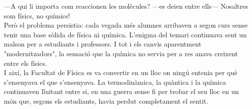 —A qui li importa com reaccionen les molècules? —es deien entre ells— Nosaltres som físics, no químics!\\

Però el problema persistia: cada vegada més alumnes arribaven a segon curs sense tenir una base sòlida de física ni química. L'enigma del temari continuava sent un malson per a estudiants i professors. I tot i els canvis aparentment "modernitzadors", la sensació que la química no servia per a res anava creixent entre els físics.\\

I així, la Facultat de Física es va convertir en un lloc on ningú entenia per què s'ensenyava el que s'ensenyava. La termodinàmica, la quàntica i la química continuaven lluitant entre si, en una guerra sense fi per trobar el seu lloc en un món que, segons els estudiants, havia perdut completament el sentit.

\setlength{\parindent}{20pt}